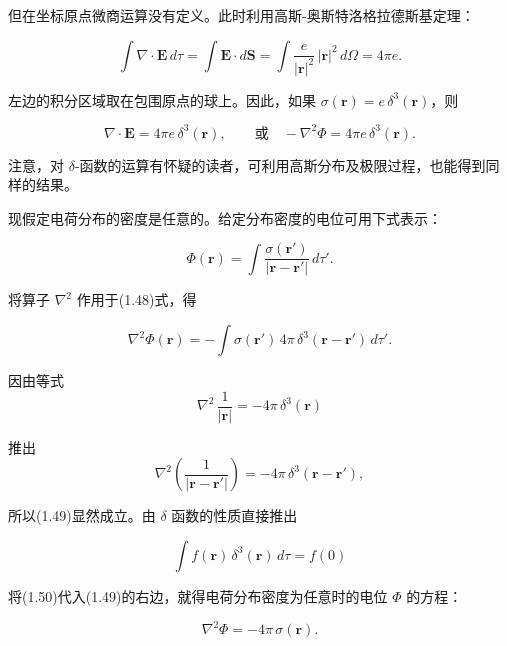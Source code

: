 \documentclass[11pt,a4paper,oneside]{ctexbook}
\newcommand{\ve}[1]{\bm{#1}}
\begin{document}
但在坐标原点微商运算没有定义。此时利用高斯-奥斯特洛格拉德斯基定理：

\begin{equation*}
\int \nabla \cdot \ve{E}\, d\tau = \int \ve{E} \cdot d\ve{S} = \int \frac{e}{|\ve{r}|^{2}}\, |\ve{r}|^{2}\, d\Omega = 4\pi e.
\end{equation*}

左边的积分区域取在包围原点的球上。因此，如果 $\sigma(\ve{r}) = e\,\delta^{3}(\ve{r})$，则

\begin{equation}
\nabla \cdot \ve{E} = 4\pi e\, \delta^{3}(\ve{r}), \qquad \text{或} \quad -\nabla^{2}\Phi = 4\pi e\, \delta^{3}(\ve{r}).
\tag{1.47}
\end{equation}

注意，对 $\delta$-函数的运算有怀疑的读者，可利用高斯分布及极限过程，也能得到同样的结果。

现假定电荷分布的密度是任意的。给定分布密度的电位可用下式表示：

\begin{equation}
\Phi(\ve{r}) = \int \frac{\sigma(\ve{r}')}{|\ve{r} - \ve{r}'|}\, d\tau'.
\tag{1.48}
\end{equation}

将算子 $\nabla^{2}$ 作用于(1.48)式，得

\begin{equation}
\nabla^{2}\Phi(\ve{r}) = -\int \sigma(\ve{r}')\, 4\pi\, \delta^{3}(\ve{r} - \ve{r}')\, d\tau'.
\tag{1.49}
\end{equation}

因由等式
\begin{equation*}
\nabla^{2}\, \frac{1}{|\ve{r}|} = -4\pi\, \delta^{3}(\ve{r})
\end{equation*}

推出
\begin{equation}
\nabla^{2}\left(\frac{1}{|\ve{r} - \ve{r}'|}\right) = -4\pi\, \delta^{3}(\ve{r} - \ve{r}'),
\tag{1.49a}
\end{equation}

所以(1.49)显然成立。由 $\delta$ 函数的性质直接推出

\begin{equation}
\int f(\ve{r})\, \delta^{3}(\ve{r})\, d\tau = f(0)
\tag{1.50}
\end{equation}

将(1.50)代入(1.49)的右边，就得电荷分布密度为任意时的电位 $\Phi$ 的方程：

\begin{equation}
\nabla^{2}\Phi = -4\pi\, \sigma(\ve{r}).
\tag{1.51}
\end{equation}
\end{document}
